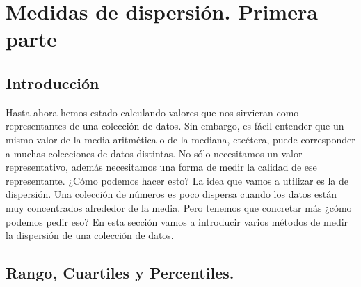 \section{Medidas de dispersión. Primera parte}

\subsection*{Introducción}

Hasta ahora hemos estado calculando valores que nos sirvieran como representantes de una colección de datos. Sin embargo, es fácil entender que un mismo valor de la media aritmética o de la mediana, etcétera, puede corresponder a muchas colecciones de datos distintas. {\sf No sólo necesitamos un valor representativo, además necesitamos una forma de medir la calidad de ese representante.} ¿Cómo podemos hacer esto? La idea que vamos a utilizar es la de {\sf dispersión}. Una colección de números es poco dispersa cuando los datos están muy concentrados alrededor de la media. Pero tenemos que concretar más ¿cómo podemos pedir eso? En esta sección vamos a introducir varios métodos de medir la dispersión de una colección de datos.

\subsection{Rango, Cuartiles y Percentiles.}

